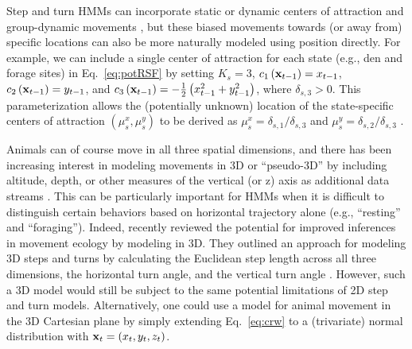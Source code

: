 \documentclass[12pt]{article}\usepackage[]{graphicx}\usepackage[]{xcolor}
\begin{document}
Step and turn HMMs can incorporate static or dynamic centers of attraction \citep[e.g.,][]{McClintockEtAl2012,PirottaEtAl2018} and group-dynamic movements \citep[e.g.,][]{LangrockEtAl2014}, but these biased movements towards (or away from) specific locations can also be more naturally modeled using position directly. For example, we can include a single center of attraction for each state (e.g., den and forage sites) in Eq.\ \ref{eq:potRSF} by setting $K_s=3$, $c_1\left({\bf x}_{t-1}\right)=x_{t-1}$, $c_2\left({\bf x}_{t-1}\right)=y_{t-1}$, and $c_3\left({\bf x}_{t-1}\right)=-\frac{1}{2}\left(x_{t-1}^2+y_{t-1}^2\right)$, where $\delta_{s,3}>0$.
This parameterization allows the (potentially unknown) location of the state-specific centers of attraction $\left(\mu^x_s,\mu^y_s\right)$ to be derived as $\mu^x_s=\delta_{s,1}/\delta_{s,3}$ and $\mu^y_s=\delta_{s,2}/\delta_{s,3}$ \citep[][]{blackwell2024joint}.

Animals can of course move in all three spatial dimensions, and there has been increasing interest in modeling movements in 3D or ``pseudo-3D'' by including altitude, depth, or other measures of the vertical (or z) axis as additional data streams \citep[e.g.,][]{McClintockEtAl2013c,LaplancheEtAl2015,DeRuiterEtAl2017}. This can be particularly important for HMMs when it is difficult to distinguish certain behaviors based on horizontal trajectory alone (e.g., ``resting'' and ``foraging''). Indeed, \cite{LennoxEtAl2025} recently reviewed the potential for improved inferences in movement ecology by modeling in 3D. They outlined an approach for modeling 3D steps and turns by calculating the Euclidean step length across all three dimensions, the horizontal turn angle, and the vertical turn angle \citep[e.g.,][]{AHMED2021110728,KlappsteinEtAl2025}. However, such a 3D model would still be subject to the same potential limitations of 2D step and turn models. Alternatively, one could use 
a model for animal movement in the 3D Cartesian plane by simply extending Eq.\ \ref{eq:crw} to a (trivariate) normal distribution with ${\bf x}_t = \left(x_t,y_t,z_t\right)$.
\end{document}
